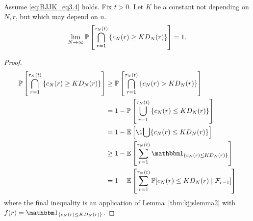 \begin{lemma}\label{thm:indicators_DN}
Assume \eqref{eq:BJJK_eq3.4} holds.
Fix $t>0$.
Let $K$ be a constant not depending on $N, r$, but which may depend on $n$.
\begin{equation*}
\lim_{N\to\infty} \mathbb{P} \left[ \bigcap_{r=1}^{\tau_N(t)} 
        \left\{ c_N(r) \geq K D_N(r) \right\} \right] 
= 1 . 
\end{equation*}
\end{lemma}

\begin{proof}
\begin{align}
\Prob \left[ \bigcap_{r=1}^{\tau_N(t)} 
        \left\{ c_N(r) \geq K D_N(r) \right\} \right]
&\geq \Prob \left[ \bigcap_{r=1}^{\tau_N(t)} 
        \left\{ c_N(r) > K D_N(r) \right\} \right] \notag\\
&= 1- \Prob \left[ \bigcup_{r=1}^{\tau_N(t)} 
        \left\{ c_N(r) \leq K D_N(r) \right\} \right] \notag\\
&= 1- \E \left[ \1{\bigcup \{ c_N(r) \leq K D_N(r) \} } \right] \notag\\
&\geq 1- \E \left[ \sum_{r=1}^{\tau_N(t)} \I{ c_N(r) \leq K D_N(r) } \right]
        \notag\\
&= 1- \E \left[ \sum_{r=1}^{\tau_N(t)} \Prob[ c_N(r) \leq K D_N(r) 
        \mid \mathcal{F}_{r-1} ] \right] \label{eq:050}
\end{align}
where the final inequality is an application of Lemma~\ref{thm:kjjslemma2} with $f(r) = \I{ c_N(r) \leq K D_N(r) }$.


\end{proof}
